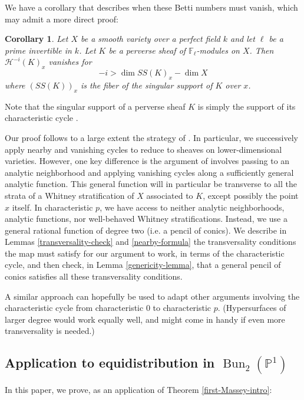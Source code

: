 \documentclass[12pt]{amsart}
\newtheorem{corollary}[theorem]{Corollary}
\theoremstyle{definition}
\theoremstyle{remark}
\def \Bun {\operatorname{Bun}}
\begin{document}
We have a corollary that describes when these Betti numbers must vanish, which may admit a more direct proof:

\begin{corollary}\label{vanishing-intro} Let $X$ be a smooth variety over a perfect field $k$ and let $\ell$ be a prime invertible in $k$. Let $K$ be a perverse sheaf of $\mathbb F_\ell$-modules on $X$. Then $\mathcal H^{-i} (K)_x$ vanishes for \[ -i> \dim SS(K)_x - \dim X \] where $(SS(K))_x$ is the fiber of the singular support of $K$ over $x$. \end{corollary}

Note that the singular support of a perverse sheaf $K$ is simply the support of its characteristic cycle \cite[Proposiiton 5.14(2)]{saito1}.

Our proof follows to a large extent the strategy of \citep{Massey}. In particular, we successively apply nearby and vanishing cycles to reduce to sheaves on lower-dimensional varieties. However, one key difference is the argument of \citep{Massey} involves passing to an analytic neighborhood and applying vanishing cycles along a sufficiently general analytic function. This general function will in particular be transverse to all the strata of a Whitney stratification of $X$ associated to $K$, except possibly the point $x$ itself. In characteristic $p$, we have access to neither analytic neighborhoods, analytic functions, nor well-behaved Whitney stratifications. Instead, we use a general rational function of degree two (i.e. a pencil of conics). We describe in Lemmas \ref{transversality-check} and \ref{nearby-formula} the transversality conditions the map must satisfy for our argument to work, in terms of the characteristic cycle, and then check, in Lemma \ref{genericity-lemma}, that a general pencil of conics satisfies all these transversality conditions. 

A similar approach can hopefully be used to adapt other arguments involving the characteristic cycle from characteristic $0$ to characteristic $p$.  (Hypersurfaces of larger degree would work equally well, and might come in handy if even more transversality is needed.) 



\subsection{Application to equidistribution in $\Bun_2(\mathbb P^1)$}

In this paper, we prove, as an application of Theorem \ref{first-Massey-intro}:
\end{document}
